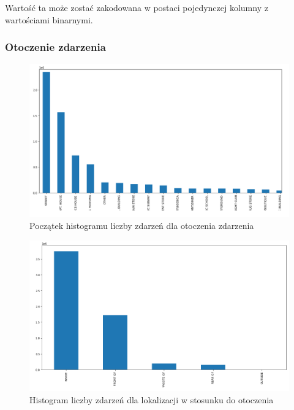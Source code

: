 \documentclass{classrep}
\begin{document}
{{{                Wartość ta może zostać zakodowana w postaci pojedynczej kolumny z
                wartościami binarnymi.
            }

            \subsubsection{Otoczenie zdarzenia} {
                \begin{figure}[!htbp]
                    \centering
                    \includegraphics[width=\textwidth]{img/hist_prem.png}
                    \caption{Początek histogramu liczby zdarzeń dla otoczenia zdarzenia}
                    \label{hist_prem}
                \end{figure}
                \begin{figure}[!htbp]
                    \centering
                    \includegraphics[width=\textwidth]{img/hist_loc_prem.png}
                    \caption{Histogram liczby zdarzeń dla lokalizacji w stosunku do otoczenia}
                    \label{hist_loc_prem}
                \end{figure}
                \FloatBarrier

}}}
\end{document}
